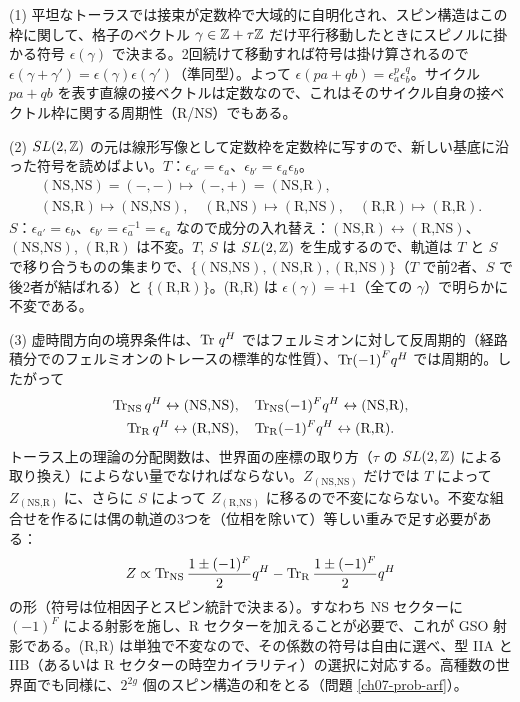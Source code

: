 \begin{solution}
(1) 平坦なトーラスでは接束が定数枠で大域的に自明化され、スピン構造はこの枠に関して、格子のベクトル $\gamma\in\mathbb{Z}+\tau\mathbb{Z}$ だけ平行移動したときにスピノルに掛かる符号 $\epsilon(\gamma)$ で決まる。2回続けて移動すれば符号は掛け算されるので $\epsilon(\gamma+\gamma')=\epsilon(\gamma)\epsilon(\gamma')$（準同型）。よって $\epsilon(pa+qb)=\epsilon_a^p\epsilon_b^q$。サイクル $pa+qb$ を表す直線の接ベクトルは定数なので、これはそのサイクル自身の接ベクトル枠に関する周期性（R/NS）でもある。

(2) $SL(2,\mathbb{Z})$ の元は線形写像として定数枠を定数枠に写すので、新しい基底に沿った符号を読めばよい。$T$：$\epsilon_{a'}=\epsilon_a$、$\epsilon_{b'}=\epsilon_a\epsilon_b$。
\begin{gather*}
(\text{NS,NS})=(-,-)\mapsto(-,+)=(\text{NS,R}),\\ (\text{NS,R})\mapsto(\text{NS,NS}),\quad(\text{R,NS})\mapsto(\text{R,NS}),\quad(\text{R,R})\mapsto(\text{R,R}).
\end{gather*}
$S$：$\epsilon_{a'}=\epsilon_b$、$\epsilon_{b'}=\epsilon_a^{-1}=\epsilon_a$ なので成分の入れ替え：$(\text{NS,R})\leftrightarrow(\text{R,NS})$、$(\text{NS,NS})$, $(\text{R,R})$ は不変。$T$, $S$ は $SL(2,\mathbb{Z})$ を生成するので、軌道は $T$ と $S$ で移り合うものの集まりで、$\{(\text{NS,NS}),(\text{NS,R}),(\text{R,NS})\}$（$T$ で前2者、$S$ で後2者が結ばれる）と $\{(\text{R,R})\}$。(R,R) は $\epsilon(\gamma)=+1$（全ての $\gamma$）で明らかに不変である。

(3) 虚時間方向の境界条件は、$\Tr\,q^H$ ではフェルミオンに対して反周期的（経路積分でのフェルミオンのトレースの標準的な性質）、$\Tr(-1)^Fq^H$ では周期的。したがって
\begin{gather*}
\Tr_{\rm NS}q^H\leftrightarrow(\text{NS,NS}),\quad\Tr_{\rm NS}(-1)^Fq^H\leftrightarrow(\text{NS,R}),\\ \Tr_{\rm R}q^H\leftrightarrow(\text{R,NS}),\quad\Tr_{\rm R}(-1)^Fq^H\leftrightarrow(\text{R,R}).
\end{gather*}
トーラス上の理論の分配関数は、世界面の座標の取り方（$\tau$ の $SL(2,\mathbb{Z})$ による取り換え）によらない量でなければならない。$Z_{(\text{NS,NS})}$ だけでは $T$ によって $Z_{(\text{NS,R})}$ に、さらに $S$ によって $Z_{(\text{R,NS})}$ に移るので不変にならない。不変な組合せを作るには偶の軌道の3つを（位相を除いて）等しい重みで足す必要がある：
\[
Z\propto\Tr_{\rm NS}\frac{1\pm(-1)^F}{2}q^H-\Tr_{\rm R}\frac{1\pm(-1)^F}{2}q^H
\]
の形（符号は位相因子とスピン統計で決まる）。すなわち NS セクターに $(-1)^F$ による射影を施し、R セクターを加えることが必要で、これが GSO 射影である。(R,R) は単独で不変なので、その係数の符号は自由に選べ、型 IIA と IIB（あるいは R セクターの時空カイラリティ）の選択に対応する。高種数の世界面でも同様に、$2^{2g}$ 個のスピン構造の和をとる（問題 \ref{ch07-prob-arf}）。
\end{solution}


